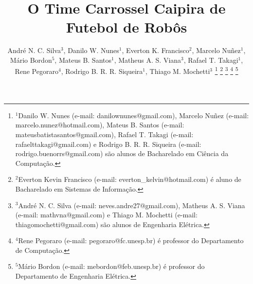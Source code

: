 \title{\LARGE \bf
O Time Carrossel Caipira de Futebol de Robôs
}

%
\author{{\centering André N. C. Silva$^{3}$, Danilo W. Nunes$^{1}$, Everton K. Francisco$^{2}$, Marcelo Nuñez$^{1}$, Mário Bordon$^{5}$,}%
{\authorblockN \centering Mateus B. Santos$^{1}$, Matheus A. S. Viana$^{3}$, Rafael T. Takagi$^{1}$, Rene Pegoraro$^{4}$, Rodrigo B. R. R. Siqueira$^{1}$,}%
{\authorblockN \centering Thiago M. Mochetti$^{3}$}%
%
\thanks{$^{1}$Danilo W. Nunes (e-mail: danilownunes@gmail.com), Marcelo Nuñez (e-mail: marcelo.nunez@hotmail.com), Mateus B. Santos (e-mail: mateusbatistasantos@gmail.com), Rafael T. Takagi (e-mail: rafaelttakagi@gmail.com) e Rodrigo B. R. R. Siqueira (e-mail: rodrigo.buenorrs@gmail.com) são alunos de Bacharelado em Ciência da Computação.}
\thanks{$^{2}$Everton Kevin Francisco (e-mail: everton\_kelvin@hotmail.com) é aluno de Bacharelado em Sistemas de Informação.}
\thanks{$^{3}$André N. C. Silva (e-mail: neves.andre27@gmail.com), Matheus A. S. Viana (e-mail: mathvna@gmail.com) e Thiago M. Mochetti (e-mail: thiagomochetti@gmail.com) são alunos de Engenharia Elétrica.}
\thanks{$^{4}$Rene Pegoraro (e-mail: pegoraro@fc.unesp.br) é professor do Departamento de Computação.}
\thanks{$^{5}$Mário Bordon (e-mail: mebordon@feb.unesp.br) é professor do Departamento de Engenharia Elétrica.}
}
